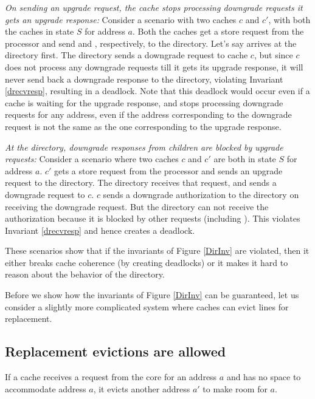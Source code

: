 \begin{scen}
\emph{On sending an upgrade request, the cache stops processing downgrade
requests it gets an upgrade response:}
Consider a scenario with two caches $c$ and $c'$, with both the caches in state
$S$ for address $a$. Both the caches get a store request from the processor and
send  and , respectively, to the directory.
Let's say  arrives at the directory first. The directory
sends a downgrade request to cache $c$, but since $c$ does not process any
downgrade requests till it gets its upgrade response, it will never send back a
downgrade response to the directory, violating Invariant \ref{drecvresp},
resulting in a deadlock. Note that this deadlock would occur even if a cache is
waiting for the upgrade response, and stops processing downgrade requests for
any address, even if the address corresponding to the downgrade request is not
the same as the one corresponding to the upgrade response.
\end{scen}

\begin{scen}
\emph{At the directory, downgrade responses from children are blocked by upgrade
requests:}
Consider a scenario where two caches $c$ and $c'$ are both in state $S$ for
address $a$. $c'$ gets a store request from the processor and sends an upgrade
request  to the directory. The directory receives that
request, and sends a downgrade request  to $c$. $c$ sends a
downgrade authorization  to the directory on receiving the
downgrade request. But the directory can not receive the authorization because
it is blocked by other requests (including ). This violates
Invariant \ref{drecvresp} and hence creates a deadlock.
\end{scen}

These scenarios show that if the invariants of Figure \ref{DirInv} are violated,
then it either breaks cache coherence (by creating deadlocks) or it makes
it hard to reason about the behavior of the directory.

Before we show how the invariants of Figure \ref{DirInv} can be guaranteed, let
us consider a slightly more complicated system where caches can evict lines for
replacement.

\subsection{Replacement evictions are allowed}
If a cache receives a request from the core for an address $a$ and has no space
to accommodate address $a$, it evicts another address $a'$ to make room for $a$.

